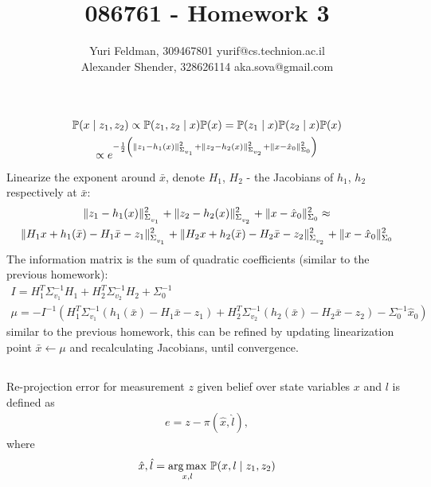 \documentclass[a4paper]{scrreprt}
\title{086761 - Homework 3}
\author{Yuri Feldman, 309467801 yurif@cs.technion.ac.il \\
	    Alexander Shender, 328626114 aka.sova@gmail.com }
\begin{document}
\maketitle
\chapter{}
\section{}
\begin{gather}
	\prob{x\mid z_1, z_2} \propto \prob{z_1, z_2\mid x} \prob{x} 
	= \prob{z_1\mid x} \prob{z_2\mid x} \prob{x} \\
	\propto e^{-\frac{1}{2}\left(
	\nrmsq{\Sigma_{_{v_1}}}{z_1-h_1(x)}
	+\nrmsq{\Sigma_{_{v_2}}}{z_2-h_2(x)}
	+ \nrmsq{\Sigma_0}{x-\hat{x}_0}
	\right)}
\end{gather}
Linearize the exponent around $\bar{x}$, denote $H_1$, $H_2$ - the Jacobians of 
$h_1$, $h_2$ respectively at $\bar{x}$: 
\begin{gather}
	\nrmsq{\Sigma_{_{v_1}}}{z_1-h_1(x)}
	+\nrmsq{\Sigma_{_{v_2}}}{z_2-h_2(x)}
	+ \nrmsq{\Sigma_0}{x-\hat{x}_0}
	\approx \\
	\nrmsq{\Sigma_{_{v_1}}}{H_1x+h_1(\bar{x})-H_1\bar{x}-z_1}
	+\nrmsq{\Sigma_{_{v_2}}}{H_2x+h_2(\bar{x})-H_2\bar{x}-z_2}
	+ \nrmsq{\Sigma_0}{x-\hat{x}_0}	
\end{gather}
The information matrix is the sum of quadratic coefficients (similar to the 
previous homework): 
\begin{gather}
	I = H_1^T\Sigma^{-1}_{v_1}H_1 + H_2^T\Sigma^{-1}_{v_2}H_2 + \Sigma_0^{-1} \\
	\mu = -I^{-1} 
	\left(
	H_1^T\Sigma^{-1}_{v_1}(h_1(\bar{x})-H_1\bar{x}-z_1)
	+H_2^T\Sigma^{-1}_{v_2}(h_2(\bar{x})-H_2\bar{x}-z_2)
	-\Sigma_0^{-1}\hat{x}_0
	\right)
\end{gather}
similar to the previous homework, this can be refined by updating linearization 
point $\bar{x}\gets \mu$ and recalculating Jacobians, until convergence. 

\section{}
Re-projection error for measurement $z$ given belief over state 
variables $x$ 
and $l$ is defined as
\begin{gather}
	e = z - \pi\left(\hat{x}, \hat{l}\right),
\end{gather}
where 
\begin{gather}
	\hat{x},\hat{l} = \argmax_{x,l}\,\blf{x,l\mid z_1, z_2}
\end{gather}
\end{document}
